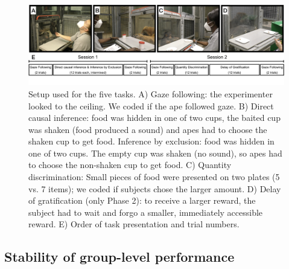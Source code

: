\documentclass[
  man,floatsintext]{apa6}
\begin{document}
\begin{figure}
\includegraphics[width=1\linewidth]{./figures/setup} \caption{Setup used for the five tasks. A) Gaze following: the experimenter looked to the ceiling. We coded if the ape followed gaze. B) Direct causal inference: food was hidden in one of two cups, the baited cup was shaken (food produced a sound) and apes had to choose the shaken cup to get food. Inference by exclusion: food was hidden in one of two cups. The empty cup was shaken (no sound), so apes had to choose the non-shaken cup to get food. C) Quantity discrimination: Small pieces of food were presented on two plates (5 vs. 7 items); we coded if subjects chose the larger amount. D) Delay of gratification (only Phase 2): to receive a larger reward, the subject had to wait and forgo a smaller, immediately accessible reward. E) Order of task presentation and trial numbers.}\label{fig:setup}
\end{figure}

\hypertarget{stability-of-group-level-performance}{%
\subsection{Stability of group-level performance}\label{stability-of-group-level-performance}}
\end{document}

